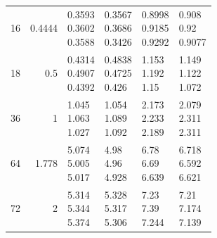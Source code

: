 \begin{longtable}{rrp{2.85cm}p{2.85cm}p{2.85cm}p{2.85cm}}
16 & 0.4444 & \shortstack[r]{0.3593\\0.3602\\0.3588} & \shortstack[r]{0.3567\\0.3686\\0.3426} & \shortstack[r]{0.8998\\0.9185\\0.9292} & \shortstack[r]{0.908\\0.92\\0.9077} \\
18 & 0.5 & \shortstack[r]{0.4314\\0.4907\\0.4392} & \shortstack[r]{0.4838\\0.4725\\0.426} & \shortstack[r]{1.153\\1.192\\1.15} & \shortstack[r]{1.149\\1.122\\1.072} \\
36 & 1 & \shortstack[r]{1.045\\1.063\\1.027} & \shortstack[r]{1.054\\1.089\\1.092} & \shortstack[r]{2.173\\2.233\\2.189} & \shortstack[r]{2.079\\2.311\\2.311} \\
64 & 1.778 & \shortstack[r]{5.074\\5.005\\5.017} & \shortstack[r]{4.98\\4.96\\4.928} & \shortstack[r]{6.78\\6.69\\6.639} & \shortstack[r]{6.718\\6.592\\6.621} \\
72 & 2 & \shortstack[r]{5.314\\5.344\\5.374} & \shortstack[r]{5.328\\5.317\\5.306} & \shortstack[r]{7.23\\7.39\\7.244} & \shortstack[r]{7.21\\7.174\\7.139} \\

\end{longtable}
